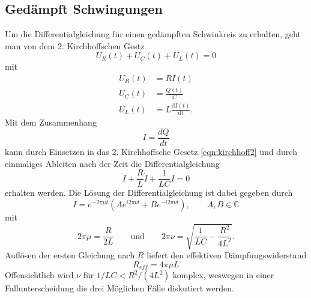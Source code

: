 \subsection{Gedämpft Schwingungen}
\label{sec:gedämpft}
Um die Differentialgleichung für einen gedämpften Schwinkreis zu erhalten, geht man von dem 2. Kirchhoffschen Gestz
\begin{equation}
    U_R(t)+U_C(t)+U_L(t)=0
    \label{eqn:kirchhoff2}
\end{equation}
mit
\begin{align*}
U_R(t)&=RI(t)                           \\
U_C(t)&=\frac{Q(t)}{C}                  \\
U_L(t)&=L\frac{\text{d}I(t)}{\text{d}t}    .
\end{align*}
Mit dem Zusammenhang 
\begin{equation*}
    I=\frac{dQ}{dt}
\end{equation*}
kann durch Einsetzen in das 2. Kirchhoffsche Gesetz \eqref{eqn:kirchhoff2} und durch einmaliges Ableiten nach der Zeit
die Differentialgleichung
\begin{equation}
    \ddot{I}+\frac{R}{L}\dot{I}+\frac{1}{LC}I=0
    \label{eqn:DGL1}
\end{equation}
erhalten werden. Die Lösung der Differentialgleichung ist dabei gegeben durch
\begin{equation}
    I=e^{-2\pi\mu t}\left(Ae^{i2\pi\nu t}+Be^{-i2\pi\nu t}\right), \qquad A,B\in\mathbb{C}
    \label{eqn:Losung1}
\end{equation}
mit
\begin{equation*}
    2\pi \mu=\frac{R}{2L} 
    \qquad\text{und}\qquad 
    2\pi \nu=\sqrt{\frac{1}{LC}-\frac{R^2}{4L^2}} .
\end{equation*}
Auflösen der ersten Gleichung nach $R$ liefert den effektiven Dämpfungswiderstand 
\begin{equation}
    R_{eff}=4\pi\mu L 
    \label{eqn:Reff}
\end{equation}
Offensichtlich wird $\nu$ für $1/LC<R^2/(4L^2)$ komplex, weswegen in einer Fallunterscheidung die drei Möglichen Fälle 
diskutiert werden.

